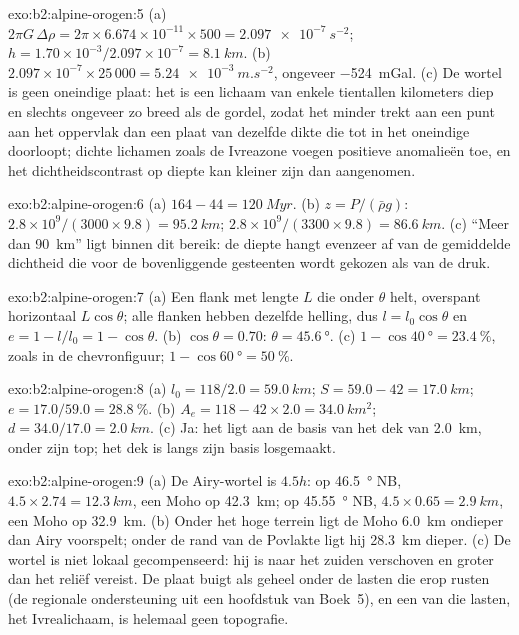 \begin{solution}{exo:b2:alpine-orogen:5}
(a) $2\pi G\,\Delta\rho = 2\pi\times6.674\times10^{-11}\times500 =
\qty{2.097e-7}{s^{-2}}$; $h = 1.70\times10^{-3}/2.097\times10^{-7} = \qty{8.1}{km}$.
(b) $2.097\times10^{-7}\times25\,000 = \qty{5.24e-3}{m.s^{-2}}$, ongeveer
\qty{-524}{mGal}. (c) De wortel is geen oneindige plaat: het is een lichaam van enkele tientallen kilometers
diep en slechts ongeveer zo breed als de gordel, zodat het minder trekt aan een punt aan het oppervlak dan een
plaat van dezelfde dikte die tot in het oneindige doorloopt; dichte lichamen zoals de Ivreazone
voegen positieve anomalieën toe, en het dichtheidscontrast op diepte kan kleiner zijn dan aangenomen.
\end{solution}

\begin{solution}{exo:b2:alpine-orogen:6}
(a) $164 - 44 = \qty{120}{Myr}$. (b) $z = P/(\bar\rho g)$:
$2.8\times10^9/(3000\times9.8) = \qty{95.2}{km}$; $2.8\times10^9/(3300\times9.8) =
\qty{86.6}{km}$. (c) ``Meer dan \qty{90}{km}'' ligt binnen dit bereik: de diepte hangt evenzeer af van
de gemiddelde dichtheid die voor de bovenliggende gesteenten wordt gekozen als van de druk.
\end{solution}

\begin{solution}{exo:b2:alpine-orogen:7}
(a) Een flank met lengte $L$ die onder $\theta$ helt, overspant horizontaal $L\cos\theta$; alle flanken
hebben dezelfde helling, dus $l = l_0\cos\theta$ en $e = 1 - l/l_0 = 1 - \cos\theta$.
(b) $\cos\theta = 0.70$: $\theta = \qty{45.6}{\degree}$. (c) $1 - \cos\qty{40}{\degree} =
\qty{23.4}{\percent}$, zoals in de chevronfiguur; $1 - \cos\qty{60}{\degree}
= \qty{50}{\percent}$.
\end{solution}

\begin{solution}{exo:b2:alpine-orogen:8}
(a) $l_0 = 118/2.0 = \qty{59.0}{km}$; $S = 59.0 - 42 = \qty{17.0}{km}$; $e = 17.0/59.0 =
\qty{28.8}{\percent}$. (b) $A_e = 118 - 42\times2.0 = \qty{34.0}{km^2}$; $d = 34.0/17.0 =
\qty{2.0}{km}$. (c) Ja: het  ligt aan de basis van het dek van \qty{2.0}{km}, onder
zijn top; het dek is langs zijn basis losgemaakt.
\end{solution}

\begin{solution}{exo:b2:alpine-orogen:9}
(a) De Airy-wortel is $4.5h$: op \qty{46.5}{\degree} NB, $4.5\times2.74 = \qty{12.3}{km}$, een
Moho op \qty{42.3}{km}; op \qty{45.55}{\degree} NB, $4.5\times0.65 = \qty{2.9}{km}$, een Moho
op \qty{32.9}{km}. (b) Onder het hoge terrein ligt de Moho \qty{6.0}{km} ondieper dan Airy
voorspelt; onder de rand van de Povlakte ligt hij \qty{28.3}{km} dieper. (c) De wortel is niet
lokaal gecompenseerd: hij is naar het zuiden verschoven en groter dan het reliëf vereist.
De plaat buigt als geheel onder de lasten die erop rusten (de regionale ondersteuning uit een hoofdstuk van
Boek~5), en een van die lasten, het Ivrealichaam, is helemaal geen topografie.
\end{solution}

